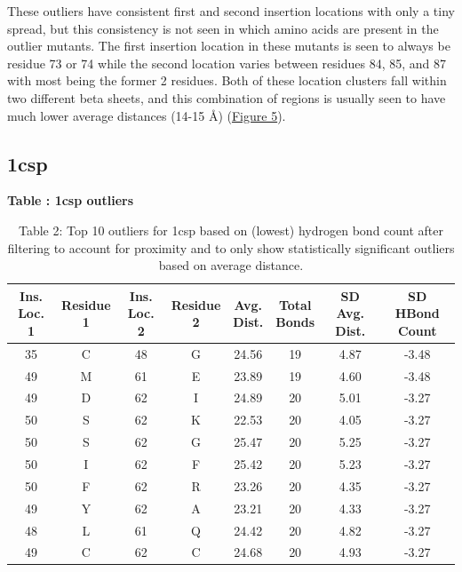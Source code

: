 \documentclass[sigconf, screen, authorversion, authoraddress=false, oneside]{acmart}
\begin{document}
These outliers have consistent first and second insertion locations with only a tiny spread, but this consistency is not seen in which amino acids are present in the outlier mutants. The first insertion location in these mutants is seen to always be residue 73 or 74 while the second location varies between residues 84, 85, and 87 with most being the former 2 residues. Both of these location clusters fall within two different beta sheets, and this combination of regions is usually seen to have much lower average distances (14-15 Å) (\hyperref[fig:Figure5]{Figure 5}).
\subsection{1csp}


\begin{table}[!ht] %
    \centering
    \textbf{\large Table \thetable: 1csp outliers} \\[1ex]
    {\small
    \setlength{\tabcolsep}{2pt} %
    \begin{tabular}{cccccccc}
    
    \toprule
    \makecell{Ins.\\Loc. 1} & 
    \makecell{Residue\\1} & 
    \makecell{Ins.\\Loc. 2} & 
    \makecell{Residue\\2} & 
    \makecell{Avg.\\Dist.} & 
    \makecell{Total\\Bonds} & 
    \makecell{SD Avg.\\Dist.} & 
    \makecell{SD HBond\\Count} \\
    \midrule
    35 & C & 48 & G & 24.56 & 19 & 4.87 & -3.48 \\
    49 & M & 61 & E & 23.89 & 19 & 4.60 & -3.48 \\
    49 & D & 62 & I & 24.89 & 20 & 5.01 & -3.27 \\
    50 & S & 62 & K & 22.53 & 20 & 4.05 & -3.27 \\
    50 & S & 62 & G & 25.47 & 20 & 5.25 & -3.27 \\
    50 & I & 62 & F & 25.42 & 20 & 5.23 & -3.27 \\
    50 & F & 62 & R & 23.26 & 20 & 4.35 & -3.27 \\
    49 & Y & 62 & A & 23.21 & 20 & 4.33 & -3.27 \\
    48 & L & 61 & Q & 24.42 & 20 & 4.82 & -3.27 \\
    49 & C & 62 & C & 24.68 & 20 & 4.93 & -3.27 \\
    \bottomrule
    \end{tabular}
    }
    \caption*{Table 2: Top 10 outliers for 1csp based on (lowest) hydrogen bond count after filtering to account for proximity and to only show statistically significant outliers based on average distance.}
    \label{table:2}
\end{table} 
\end{document}
